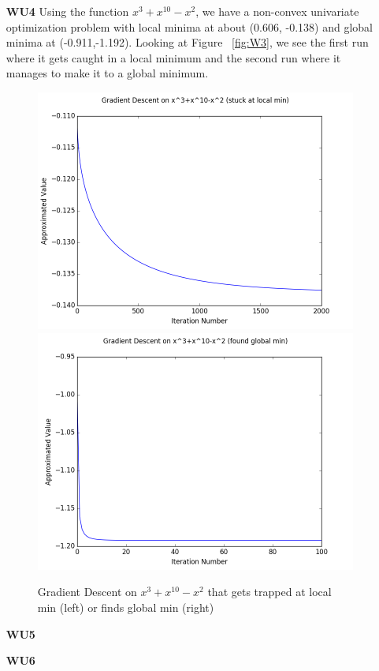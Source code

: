 \documentclass{article}
\begin{document}
\begin{enumerate}
	\item[\textbf{WU4}] 
Using the function $x^3+x^{10}-x^2$, we have a non-convex univariate optimization problem with local minima at about (0.606, -0.138) and global minima at (-0.911,-1.192). Looking at Figure ~\ref{fig:W3}, we see the first run where it gets caught in a local minimum and the second run  where it manages to make it to a global minimum.

\begin{figure}[htp]
\centering
\includegraphics[width=.5\textwidth]{gd_local_min.png}\hfill
\includegraphics[width=.5\textwidth]{gd_global_min.png}
\caption{Gradient Descent on $x^3+x^{10}-x^2$ that gets trapped at local min (left) or finds global min (right)}
\label{fig:WU3}
\end{figure}

	\item[\textbf{WU5}] 
		
	\item[\textbf{WU6}]
	
	\end{enumerate}
	
\end{document}
